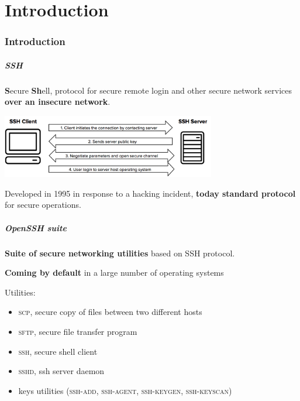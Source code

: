 \part{Introduction}
\section{Introduction}

\begin{frame}
	\partpage
\end{frame}

\begin{frame}
	\frametitle{SSH}
	
	\textbf{S}ecure \textbf{Sh}ell, protocol for secure remote login and other secure network services \textbf{over an insecure network}. 
	
	\smallskip
	
	\begin{center}    
  \includegraphics[width=0.7\textwidth]{images/ssh}
  \end{center}

	\smallskip
	
	Developed in 1995 in response to a hacking incident, \textbf{today standard protocol} for secure operations.

\end{frame}


\begin{frame}
	\frametitle{OpenSSH suite}
		
	\textbf{Suite of secure networking utilities} based on SSH protocol.
	
	\medskip
	
	\textbf{Coming by default} in a large number of operating systems
	
	\medskip
		
	Utilities:
	
	\begin{itemize}
	  \item \textsc{scp}, secure copy of files between two different hosts
	  \item \textsc{sftp}, secure file transfer program
	  \item \textsc{ssh}, secure shell client
	  \item \textsc{sshd}, ssh server daemon
	  \item keys utilities (\textsc{ssh-add}, \textsc{ssh-agent}, \textsc{ssh-keygen}, \textsc{ssh-keyscan})
	\end{itemize}

\end{frame}


